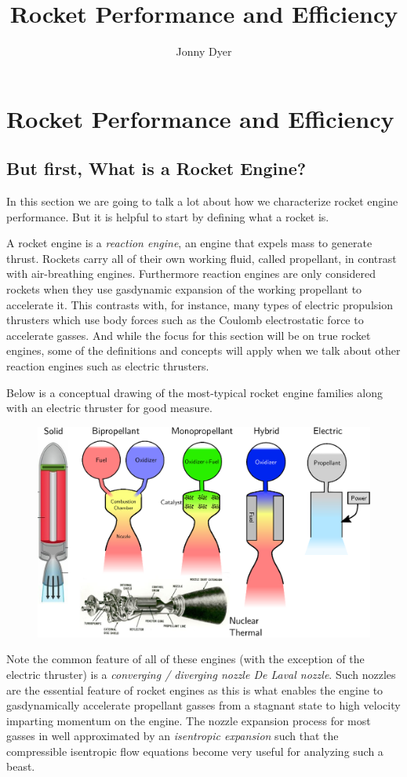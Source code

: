 \documentclass[twocolumn]{memoir} %
\title{Rocket Performance and Efficiency}
\author{Jonny Dyer}
\begin{document}
\chapter*{Rocket Performance and Efficiency}

\section{But first, What is a Rocket Engine?}
In this section we are going to talk a lot about how we characterize rocket engine performance.
But it is helpful to start by defining what a rocket is.

A rocket engine is a \emph{reaction engine}, an engine that expels mass to generate thrust.  Rockets
carry all of their own working fluid, called propellant, in contrast with air-breathing engines.
Furthermore reaction engines are only considered rockets when they use gasdynamic expansion
of the working propellant to accelerate it.  This contrasts with, for instance, many types of electric 
propulsion thrusters which use body forces such as the Coulomb electrostatic force to accelerate 
gasses.  And while the focus for this section will be on true rocket engines, some of the definitions
and concepts will apply when we talk about other reaction engines such as electric thrusters.

Below is a conceptual drawing of the most-typical rocket engine families along with an electric
thruster for good measure.

\begin{figure}[H]
    \centering
    \includegraphics[width=0.95\columnwidth]{thermal_types}
\end{figure}

Note the common feature of all of these engines (with the exception of the electric thruster) is a
\emph{converging / diverging nozzle De Laval nozzle}.  Such nozzles are the essential feature of
rocket engines as this is what enables the engine to gasdynamically accelerate propellant gasses
from a stagnant state to high velocity imparting momentum on the engine.  The nozzle expansion
process for most gasses in well approximated by an \emph{isentropic expansion} such that
the compressible isentropic flow equations become very useful for analyzing such a beast.
\end{document}
